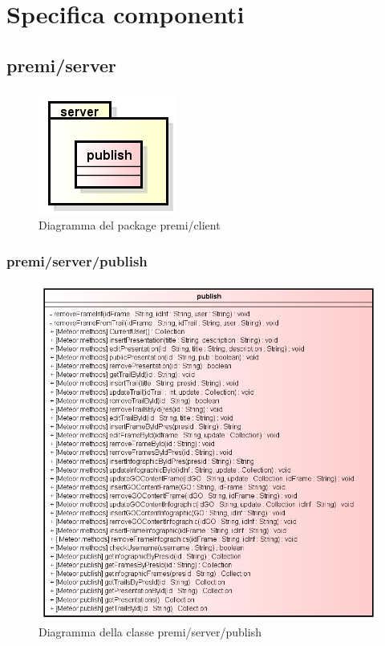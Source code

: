 \section{Specifica componenti}

\subsection{premi/server}
\begin{figure}[h]
\begin{center}
\includegraphics[scale=0.45]{img/diapkg/server.png}
\caption{Diagramma del package premi/client}
\end{center}
\end{figure}


\subsubsection{premi/server/publish}
\begin{figure}[h]
\begin{center}
\includegraphics[scale=0.90]{img/diacla/publish.png}
\caption{Diagramma della classe premi/server/publish}
\end{center}
\end{figure}




